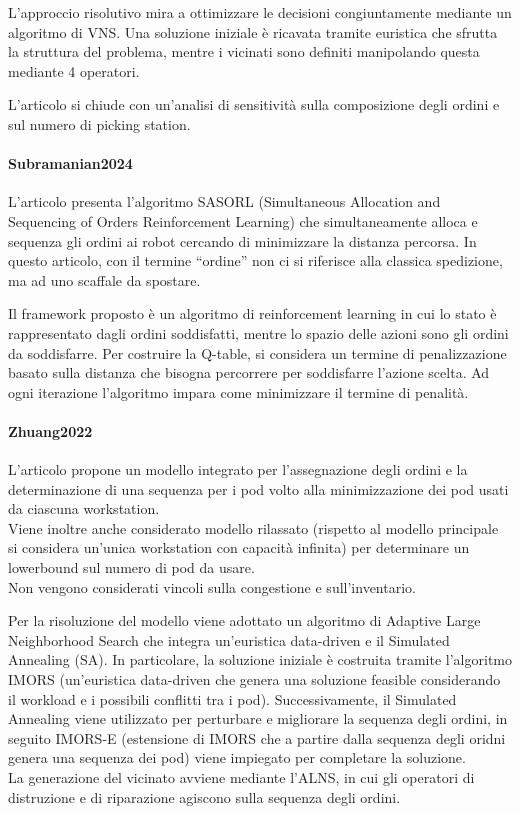 \documentclass{article}
\begin{document}
L'approccio risolutivo mira a ottimizzare le decisioni congiuntamente mediante un algoritmo di VNS.
Una soluzione iniziale è ricavata tramite euristica che sfrutta la struttura del problema, mentre i vicinati sono definiti manipolando questa mediante 4 operatori.

L'articolo si chiude con un'analisi di sensitività sulla composizione degli ordini e sul numero di picking station.



\paragraph{Subramanian2024 \cite{Subramanian2024}}
L'articolo presenta l'algoritmo SASORL (Simultaneous Allocation and Sequencing of Orders Reinforcement Learning) che simultaneamente alloca e sequenza gli ordini ai robot cercando di minimizzare la distanza percorsa. In questo articolo, con il termine \enquote{ordine} non ci si riferisce alla classica spedizione, ma ad uno scaffale da spostare.

Il framework proposto è un algoritmo di reinforcement learning in cui lo stato è rappresentato dagli ordini soddisfatti, mentre lo spazio delle azioni sono gli ordini da soddisfarre. Per costruire la Q-table, si considera un termine di penalizzazione basato sulla distanza che bisogna percorrere per soddisfarre l'azione scelta. 
Ad ogni iterazione l'algoritmo impara come minimizzare il termine di penalità.



\paragraph{Zhuang2022 \cite{Zhuang2022}}
L'articolo propone un modello integrato per l'assegnazione degli ordini e la determinazione di una sequenza per i pod volto alla minimizzazione dei pod usati da ciascuna workstation. \\
Viene inoltre anche considerato modello rilassato (rispetto al modello principale si considera un'unica workstation con capacità infinita) per determinare un lowerbound sul numero di pod da usare. \\
Non vengono considerati vincoli sulla congestione e sull'inventario.

Per la risoluzione del modello viene adottato un algoritmo di Adaptive Large Neighborhood Search che integra un'euristica data-driven e il Simulated Annealing (SA).
In particolare, la soluzione iniziale è costruita tramite l'algoritmo IMORS (un'euristica data-driven che genera una soluzione feasible considerando il workload e i possibili conflitti tra i pod). Successivamente, il Simulated Annealing viene utilizzato per perturbare e migliorare la sequenza degli ordini, in seguito IMORS-E (estensione di IMORS che a partire dalla sequenza degli oridni genera una sequenza dei pod) viene impiegato per completare la soluzione. \\
La generazione del vicinato avviene mediante l'ALNS, in cui gli operatori di distruzione e di riparazione agiscono sulla sequenza degli ordini.
\end{document}

